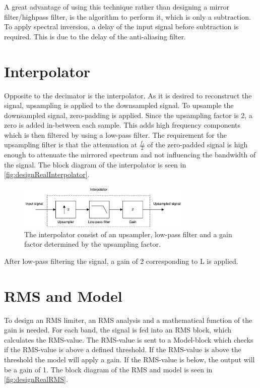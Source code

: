 A great advantage of using this technique rather than designing a mirror filter/highpass filter, is the algorithm to perform it, which is only a subtraction. To apply spectral inversion, a delay of the input signal before subtraction is required. This is due to the delay of the anti-aliasing filter.


\section{Interpolator}

Opposite to the decimator is the interpolator. As it is desired to reconstruct the signal, upsampling is applied to the downsampled signal. To upsample the downsampled signal, zero-padding is applied. Since the upsampling factor is 2, a zero is added in-between each sample. This adds high frequency components which is then filtered by using a low-pass filter. The requirement for the upsampling filter is that the attenuation at $\frac{f_s}{2}$ of the zero-padded signal is high enough to attenuate the mirrored spectrum and not influencing the bandwidth of the signal. The block diagram of the interpolator is seen in \autoref{fig:designRealInterpolator}.

\begin{figure}[H]
\centering
\includegraphics[width=0.75\textwidth]{figures/designRealInterpolator.pdf}
\caption{The interpolator consist of an upsampler, low-pass filter and a gain factor determined by the upsampling factor.}
\label{fig:designRealInterpolator}
\end{figure}

After low-pass filtering the signal, a gain of 2 corresponding to L is applied.


\section{RMS and Model}

To design an RMS limiter, an RMS analysis and a mathematical function of the gain is needed. For each band, the signal is fed into an RMS block, which calculates the RMS-value. The RMS-value is sent to a Model-block which checks if the RMS-value is above a defined threshold. If the RMS-value is above the threshold the model will apply a gain. If the RMS-value is below, the output will be a gain of 1. The block diagram of the RMS and model is seen in \autoref{fig:designRealRMS}.

